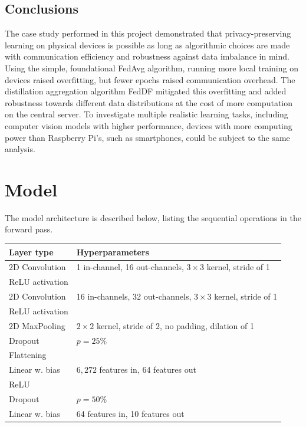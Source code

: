 \documentclass{article}
\begin{document}
\subsection{Conclusions}
The case study performed in this project demonstrated that privacy-preserving learning on physical devices is possible as long as algorithmic choices are made with communication efficiency and robustness against data imbalance in mind.
Using the simple, foundational FedAvg algorithm, running more local training on devices raised overfitting, but fewer epochs raised communication overhead.
The distillation aggregation algorithm FedDF mitigated this overfitting and added robustness towards different data distributions at the cost of more computation on the central server.
To investigate multiple realistic learning tasks, including computer vision models with higher performance, devices with more computing power than Raspberry Pi's, such as smartphones, could be subject to the same analysis.

\vfill
\pagebreak




\appendix
\section{Model}
\label{app:model}
The model architecture is described below, listing the sequential operations in the forward pass.
\begin{table}[htb!]
    \centering
    \begin{tabular}{l|p{5cm}}
            Layer type & Hyperparameters\\
            \hline
            2D Convolution & 1 in-channel, 16 out-channels, $3\times 3$ kernel, stride of 1\\
            ReLU activation\\
            2D Convolution & 16 in-channels, 32 out-channels, $3\times 3$ kernel, stride of 1\\
            ReLU activation\\
            2D MaxPooling & $2\times 2$ kernel, stride of 2, no padding, dilation of 1\\
            Dropout & $p=25\%$\\
            Flattening\\
            Linear w. bias & $6,272$ features in, 64 features out\\
            ReLU \\
            Dropout & $p=50\%$\\
            Linear w. bias & 64 features in, 10 features out
        \end{tabular}
\end{table}\noindent
\end{document}
